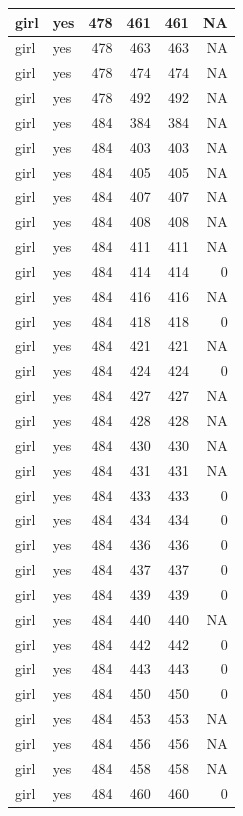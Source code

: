 \documentclass[man]{apa6}
\begin{document}
\begin{tabular}{l|l|r|r|r|r}
\hline
girl & yes & 478 & 461 & 461 & NA\\
\hline
girl & yes & 478 & 463 & 463 & NA\\
\hline
girl & yes & 478 & 474 & 474 & NA\\
\hline
girl & yes & 478 & 492 & 492 & NA\\
\hline
girl & yes & 484 & 384 & 384 & NA\\
\hline
girl & yes & 484 & 403 & 403 & NA\\
\hline
girl & yes & 484 & 405 & 405 & NA\\
\hline
girl & yes & 484 & 407 & 407 & NA\\
\hline
girl & yes & 484 & 408 & 408 & NA\\
\hline
girl & yes & 484 & 411 & 411 & NA\\
\hline
girl & yes & 484 & 414 & 414 & 0\\
\hline
girl & yes & 484 & 416 & 416 & NA\\
\hline
girl & yes & 484 & 418 & 418 & 0\\
\hline
girl & yes & 484 & 421 & 421 & NA\\
\hline
girl & yes & 484 & 424 & 424 & 0\\
\hline
girl & yes & 484 & 427 & 427 & NA\\
\hline
girl & yes & 484 & 428 & 428 & NA\\
\hline
girl & yes & 484 & 430 & 430 & NA\\
\hline
girl & yes & 484 & 431 & 431 & NA\\
\hline
girl & yes & 484 & 433 & 433 & 0\\
\hline
girl & yes & 484 & 434 & 434 & 0\\
\hline
girl & yes & 484 & 436 & 436 & 0\\
\hline
girl & yes & 484 & 437 & 437 & 0\\
\hline
girl & yes & 484 & 439 & 439 & 0\\
\hline
girl & yes & 484 & 440 & 440 & NA\\
\hline
girl & yes & 484 & 442 & 442 & 0\\
\hline
girl & yes & 484 & 443 & 443 & 0\\
\hline
girl & yes & 484 & 450 & 450 & 0\\
\hline
girl & yes & 484 & 453 & 453 & NA\\
\hline
girl & yes & 484 & 456 & 456 & NA\\
\hline
girl & yes & 484 & 458 & 458 & NA\\
\hline
girl & yes & 484 & 460 & 460 & 0\\

\end{tabular}
\end{document}
